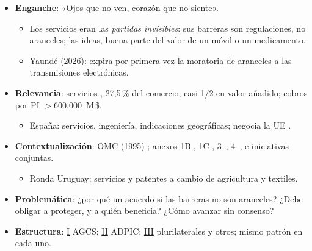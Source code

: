 \documentclass{article}
\begin{document}
\cabecerarepaso
\begin{columnas}

\begin{itemize}
\item \textbf{Enganche}: «Ojos que no ven, corazón que no siente».
  \begin{itemize}
  \item Los servicios eran las \emph{partidas invisibles}: sus barreras son regulaciones, no aranceles; las ideas, buena parte del valor de un móvil o un medicamento.
  \item Yaundé (2026): expira por primera vez la moratoria de aranceles a las transmisiones electrónicas.
  \end{itemize}
\item \textbf{Relevancia}: servicios , 27,5\,\% del comercio, casi 1/2 en valor añadido; cobros por PI $>$600.000~M\,\$.
  \begin{itemize}
  \item España: servicios, ingeniería, indicaciones geográficas; negocia la UE .
  \end{itemize}
\item \textbf{Contextualización}: OMC (1995) ; anexos 1B , 1C , 3~, 4~, e iniciativas conjuntas.
  \begin{itemize}
  \item Ronda Uruguay: servicios y patentes a cambio de agricultura y textiles.
  \end{itemize}
\item \textbf{Problemática}: ¿por qué un acuerdo si las barreras no son aranceles? ¿Debe obligar a proteger, y a quién beneficia? ¿Cómo avanzar sin consenso?
\item \textbf{Estructura}: \hyperref[rep:I]{I} AGCS; \hyperref[rep:II]{II} ADPIC; \hyperref[rep:III]{III} plurilaterales y otros; mismo patrón en cada uno.
\end{itemize}


\end{columnas}
\end{document}
